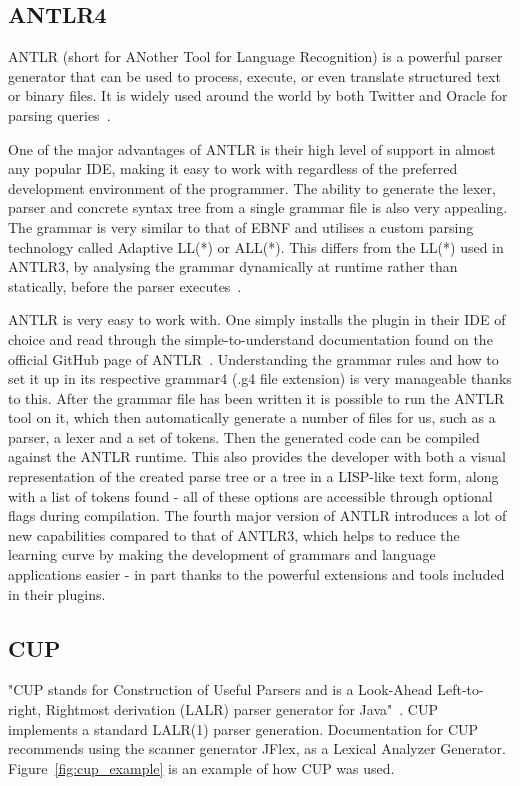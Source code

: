 \subsection{ANTLR4}
ANTLR (short for ANother Tool for Language Recognition) is a powerful parser generator that can be used to process, execute, or even translate structured text or binary files. It is widely used around the world by both Twitter and Oracle for parsing queries~\cite{ANTLR_About}.

One of the major advantages of ANTLR is their high level of support in almost any popular IDE, making it easy to work with regardless of the preferred development environment of the programmer. The ability to generate the lexer, parser and concrete syntax tree from a single grammar file is also very appealing. The grammar is very similar to that of EBNF and utilises a custom parsing technology called Adaptive LL(*) or ALL(*). This differs from the LL(*) used in ANTLR3, by analysing the grammar dynamically at runtime rather than statically, before the parser executes~\cite{Parr2014}.

ANTLR is very easy to work with. One simply installs the plugin in their IDE of choice and read through the simple-to-understand documentation found on the official GitHub page of ANTLR~\cite{ANTLR_Documentation}. Understanding the grammar rules and how to set it up in its respective grammar4 (.g4 file extension) is very manageable thanks to this. After the grammar file has been written it is possible to run the ANTLR tool on it, which then automatically generate a number of files for us, such as a parser, a lexer and a set of tokens. Then the generated code can be compiled against the ANTLR runtime. This also provides the developer with both a visual representation of the created parse tree or a tree in a LISP-like text form, along with a list of tokens found - all of these options are accessible through optional flags during compilation. The fourth major version of ANTLR introduces a lot of new capabilities compared to that of ANTLR3, which helps to reduce the learning curve by making the development of grammars and language applications easier - in part thanks to the powerful extensions and tools included in their plugins.


\subsection{CUP}
"CUP stands for Construction of Useful Parsers and is a Look-Ahead Left-to-right, Rightmost derivation (LALR) parser generator for Java"~\cite{cupParserGenerator}. CUP implements a standard LALR(1) parser generation. Documentation for CUP recommends using the scanner generator JFlex, as a Lexical Analyzer Generator. Figure~\ref{fig:cup_example} is an example of how CUP was used.


